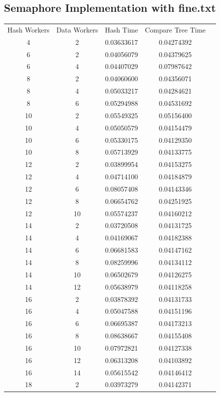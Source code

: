 \documentclass[letterpaper,12pt]{article}
\theoremstyle{remark}
\begin{document}
\subsection*{Semaphore Implementation  with fine.txt}
\begin{tabular}{ccccc}

Hash Workers & Data Workers & Hash Time & Compare Tree Time  \\
4 & 2 & 0.03633617 & 0.04274392 \\
6 & 2 & 0.04056079 & 0.04379625 \\
6 & 4 & 0.04407029 & 0.07987642 \\
8 & 2 & 0.04060600 & 0.04356071 \\
8 & 4 & 0.05033217 & 0.04284621 \\
8 & 6 & 0.05294988 & 0.04531692 \\
10 & 2 & 0.05549325 & 0.05156400 \\
10 & 4 & 0.05050579 & 0.04154479 \\
10 & 6 & 0.05330175 & 0.04129350 \\
10 & 8 & 0.05713929 & 0.04133775 \\
12 & 2 & 0.03899954 & 0.04153275 \\
12 & 4 & 0.04714100 & 0.04184879 \\
12 & 6 & 0.08057408 & 0.04143346 \\
12 & 8 & 0.06654762 & 0.04251925 \\
12 & 10 & 0.05574237 & 0.04160212 \\
14 & 2 & 0.03720508 & 0.04131725 \\
14 & 4 & 0.04169067 & 0.04182388 \\
14 & 6 & 0.06681583 & 0.04147162 \\
14 & 8 & 0.08259996 & 0.04134112 \\
14 & 10 & 0.06502679 & 0.04126275 \\
14 & 12 & 0.05638979 & 0.04118258 \\
16 & 2 & 0.03878392 & 0.04131733 \\
16 & 4 & 0.05047588 & 0.04151196 \\
16 & 6 & 0.06695387 & 0.04173213 \\
16 & 8 & 0.08638667 & 0.04155408 \\
16 & 10 & 0.07972821 & 0.04127338 \\
16 & 12 & 0.06313208 & 0.04103892 \\
16 & 14 & 0.05615542 & 0.04146412 \\
18 & 2 & 0.03973279 & 0.04142371 \\

\end{tabular}
\end{document}
